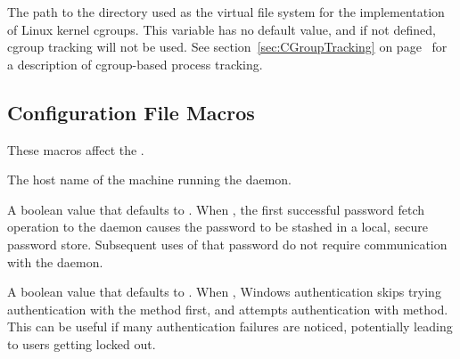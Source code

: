 \begin{description}
\label{param:BaseCgroup}
\item[\Macro{BASE\_CGROUP}]
  The path to the directory used as the virtual file system for the
  implementation of Linux kernel cgroups.
  This variable has no default value,
  and if not defined, cgroup tracking will not be used.
  See section~\ref{sec:CGroupTracking} on page~\pageref{sec:CGroupTracking} for 
  a description of cgroup-based process tracking.

\end{description}

\subsection{\label{sec:Credd-Config-File-Entries}
Configuration File Macros}
 
These macros affect the .

\begin{description}

\label{param:CreddHost}
\item[\Macro{CREDD\_HOST}]
  The host name of the machine running the  daemon.

\label{param:CreddCacheLocally}
\item[\Macro{CREDD\_CACHE\_LOCALLY}]
  A boolean value that defaults to .
  When , the first successful password fetch operation to the
   daemon causes the password to be stashed in a local, 
  secure password store.
  Subsequent uses of that password do not require
  communication with the  daemon.
  
\label{param:SkipWindowsLogonNetwork}
\item[\Macro{SKIP\_WINDOWS\_LOGON\_NETWORK}]
  A boolean value that defaults to .
  When , Windows authentication skips trying authentication
  with the  method first, 
  and attempts authentication  with  method. 
  This can be useful if many authentication failures are noticed, 
  potentially leading to users getting locked out.

\end{description}


